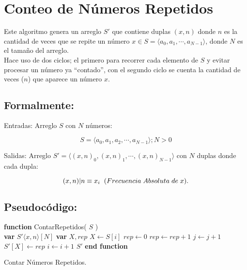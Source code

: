 \documentclass[12pt,spanish]{article}
\theoremstyle{definition}
\begin{document}
\section{Conteo de Números Repetidos}{}
Este algoritmo genera un arreglo $S'$ que contiene duplas $ (x, n)$ donde $n$ es la cantidad de veces que se repite un número $x \in S =  \left.\langle a_{0}, a_{1}, \cdots, a_{N-1} \rangle\right.$, donde $N$ es el tamaño del arreglo. \\ 
Hace uso de dos ciclos; el primero para recorrer cada elemento de $S$ y evitar procesar un número ya ``contado'', con el segundo ciclo se cuenta la cantidad de veces ($n$) que aparece un número $x$.

\subsection{Formalmente:}{}
Entradas: Arreglo $S$ con $N$ números:

\begin{equation}
    S =  \left.\langle a_{0}, a_{1}, a_{2}, \cdots, a_{N-1} \rangle\right.;
    N > 0
\end{equation}

Salidas: Arreglo $S' = \left.\langle (x,n)_{0}, (x,n)_{1}, \cdots, (x,n)_{N-1} \rangle\right.$ con $N$ duplas donde cada dupla: 

\begin{equation}
     (x,n) | n \equiv x_{i} \hspace{0.2cm}(Frecuencia \hspace{0.1cm} Absoluta \hspace{0.1cm} de \hspace{0.1cm} x ).
\end{equation} 

\subsection{Pseudocódigo:}{}
\begin{algorithm}
\begin{algorithmic}[1]
\STATE \textbf{function} ContarRepetidos( $S$ )\\
\STATE \textbf{var} $ S'\left.\langle x,n \rangle\right.[N]$
\STATE \textbf{var} $X,rep$
            \STATE $X \leftarrow S[i]$
            \STATE $rep \leftarrow 0$
                  \STATE $ rep \leftarrow rep + 1$
              \ENDIF  
            \STATE $j \leftarrow j + 1$  
            \ENDFOR
            \STATE $S'[X] \leftarrow rep$ 
        \ENDIF    
        \STATE $i \leftarrow i + 1$
    \ENDFOR
\RETURN $S'$
\STATE \textbf{end function}
\caption{Contar Números Repetidos.} \label{alg:algoritmoContar}
\end{algorithmic}
\end{algorithm}
\end{document}
